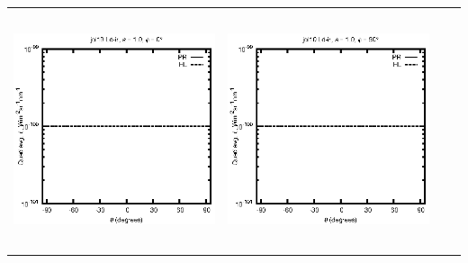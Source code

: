 \begin{tabular}{c c c c}
\includegraphics[height=7cm]{../eps/jol10_Ld_ir_fwd.eps} &
\includegraphics[height=7cm]{../eps/jol10_Ld_ir_cross.eps} \\
\end{tabular}

\pagebreak

